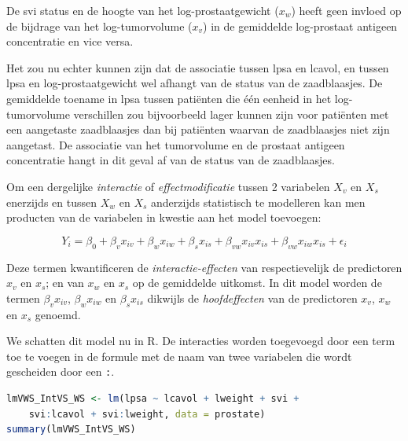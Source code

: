 \documentclass[
  12pt,dutch,coursenotes]{book}
\newcommand{\passthrough}[1]{#1}
\begin{document}
De svi status en de hoogte van het log-prostaatgewicht (\(x_w\)) heeft geen invloed op de bijdrage van het log-tumorvolume (\(x_v\)) in de gemiddelde log-prostaat antigeen concentratie en vice versa.

Het zou nu echter kunnen zijn dat de associatie tussen lpsa en lcavol, en tussen lpsa en log-prostaatgewicht wel afhangt van de status van de zaadblaasjes. De gemiddelde toename in lpsa tussen patiënten die één eenheid in het log-tumorvolume verschillen zou bijvoorbeeld lager kunnen zijn voor patiënten met een aangetaste zaadblaasjes dan bij patiënten waarvan de zaadblaasjes niet zijn aangetast. De associatie van het tumorvolume en de prostaat antigeen concentratie hangt in dit geval af van de status van de zaadblaasjes.

Om een dergelijke \textit{interactie} of \textit{effectmodificatie} tussen 2 variabelen \(X_v\) en \(X_s\) enerzijds en tussen \(X_w\) en \(X_s\) anderzijds statistisch te modelleren kan men producten van de variabelen in kwestie aan het model toevoegen:

\[
Y_i = \beta_0 + \beta_v x_{iv} + \beta_w x_{iw} +\beta_s x_{is} + \beta_{vw} x_{iv}x_{is} + \beta_{vw} x_{iw}x_{is} +\epsilon_i
\]

Deze termen kwantificeren de \emph{interactie-effecten} van respectievelijk de predictoren \(x_v\) en \(x_s\); en van \(x_w\) en \(x_s\) op de gemiddelde uitkomst.
In dit model worden de termen \(\beta_vx_{iv}\), \(\beta_wx_{iw}\) en \(\beta_sx_{is}\) dikwijls de \emph{hoofdeffecten} van de predictoren \(x_v\), \(x_w\) en \(x_s\) genoemd.

We schatten dit model nu in R. De interacties worden toegevoegd door een term toe te voegen in de formule met de naam van twee variabelen die wordt gescheiden door een \passthrough{\lstinline!:!}.

\begin{lstlisting}[language=R]
lmVWS_IntVS_WS <- lm(lpsa ~ lcavol + lweight + svi +
    svi:lcavol + svi:lweight, data = prostate)
summary(lmVWS_IntVS_WS)
\end{lstlisting}
\end{document}
